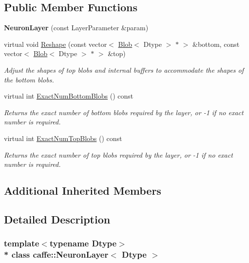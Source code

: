 \subsection*{Public Member Functions}
\begin{DoxyCompactItemize}
\item 
{\bfseries Neuron\+Layer} (const Layer\+Parameter \&param)\hypertarget{classcaffe_1_1NeuronLayer_a43348846697146ea9f01a773855b0915}{}\label{classcaffe_1_1NeuronLayer_a43348846697146ea9f01a773855b0915}

\item 
virtual void \hyperlink{classcaffe_1_1NeuronLayer_a810f5f75b95ba7fdcb9d3e0e33e98a7e}{Reshape} (const vector$<$ \hyperlink{classcaffe_1_1Blob}{Blob}$<$ Dtype $>$ $\ast$ $>$ \&bottom, const vector$<$ \hyperlink{classcaffe_1_1Blob}{Blob}$<$ Dtype $>$ $\ast$ $>$ \&top)
\begin{DoxyCompactList}\small\item\em Adjust the shapes of top blobs and internal buffers to accommodate the shapes of the bottom blobs. \end{DoxyCompactList}\item 
virtual int \hyperlink{classcaffe_1_1NeuronLayer_a83678ec7f661054d36d83fa062b639b2}{Exact\+Num\+Bottom\+Blobs} () const 
\begin{DoxyCompactList}\small\item\em Returns the exact number of bottom blobs required by the layer, or -\/1 if no exact number is required. \end{DoxyCompactList}\item 
virtual int \hyperlink{classcaffe_1_1NeuronLayer_a25dfa84e8b46705aa7a822e734b4f04f}{Exact\+Num\+Top\+Blobs} () const 
\begin{DoxyCompactList}\small\item\em Returns the exact number of top blobs required by the layer, or -\/1 if no exact number is required. \end{DoxyCompactList}\end{DoxyCompactItemize}
\subsection*{Additional Inherited Members}


\subsection{Detailed Description}
\subsubsection*{template$<$typename Dtype$>$\\*
class caffe\+::\+Neuron\+Layer$<$ Dtype $>$}

